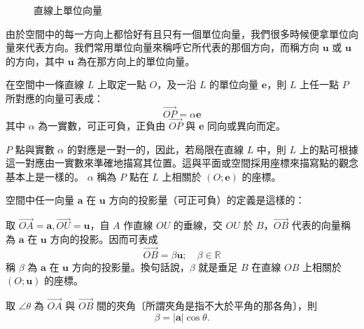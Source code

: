 \begin{figure}[H]
\begin{minipage}{0.32\textwidth}
\caption{直線上單位向量}
\label{fig:b3-fig3-32-3}
\end{minipage}
\end{figure}

由於空間中的每一方向上都恰好有且只有一個單位向量，我們很多時候便拿單位向量來代表方向。我們常用單位向量來稱呼它所代表的那個方向，而稱方向 $\mathbf{u}$ 或 $\mathbf{u}$ 的方向，其中 $\mathbf{u}$ 為在那方向上的單位向量。

在空間中一條直線 $L$ 上取定一點 $O$，及一沿 $L$ 的單位向量 $\mathbf{e}$，則 $L$ 上任一點 $P$ 所對應的向量可表成：
\[ \vec{OP} = \alpha\mathbf{e} \]
其中 $\alpha$ 為一實數，可正可負，正負由 $\vec{OP}$ 與 $\mathbf{e}$ 同向或異向而定。

$P$ 點與實數 $\alpha$ 的對應是一對一的，因此，若局限在直線 $L$ 中，則 $L$ 上的點可根據這一對應由一實數來準確地描寫其位置。這與平面或空間採用座標來描寫點的觀念基本上是一樣的。 $\alpha$ 稱為 $P$ 點在 $L$ 上相關於 $(O; \mathbf{e})$ 的座標。

\begin{definition}
空間中任一向量 $\mathbf{a}$ 在 $\mathbf{u}$ 方向的投影量（可正可負）的定義是這樣的：

取 $\vec{OA} = \mathbf{a}, \vec{OU} = \mathbf{u}$，自 $A$ 作直線 $OU$ 的垂線，交 $OU$ 於 $B$，$\vec{OB}$ 代表的向量稱為 $\mathbf{a}$ 在 $\mathbf{u}$ 方向的投影。因而可表成
\[ \vec{OB} = \beta\mathbf{u}; \quad \beta \in \mathbb{R} \]
稱 $\beta$ 為 $\mathbf{a}$ 在 $\mathbf{u}$ 方向的投影量。換句話說，$\beta$ 就是垂足 $B$ 在直線 $OB$ 上相關於 $(O; \mathbf{u})$ 的座標。

取 $\angle\theta$ 為 $\vec{OA}$ 與 $\vec{OB}$ 間的夾角〔所謂夾角是指不大於平角的那各角〕，則
\[ \beta = |\mathbf{a}|\cos\theta. \]
\end{definition}

